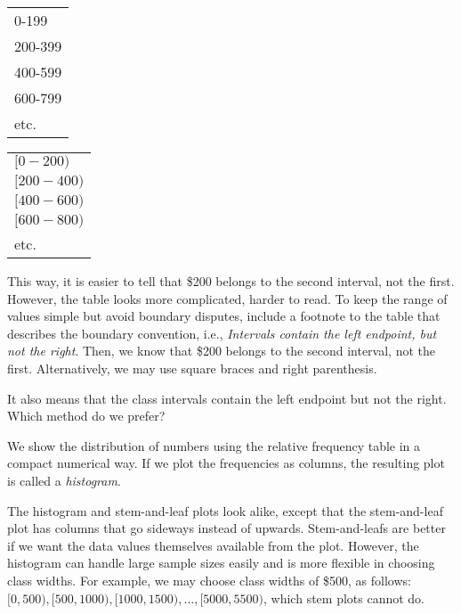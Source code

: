 \documentclass[11pt]{book}\usepackage[]{graphicx}\usepackage[]{color}
\begin{document}
\begin{minipage}[ht]{6cm}

\begin{tabular}{@{} l @{}} \hline
0-199 \\
200-399 \\
400-599 \\
600-799 \\
etc. \\ \hline
\end{tabular}

\end{minipage}
\begin{minipage}[ht]{6cm}

\begin{tabular}{@{} l @{}} \hline
$ [0-200)$ \\
$ [200-400)$ \\
$ [400-600)$ \\
$ [600-800)$ \\
 etc. \\ \hline
\end{tabular}
\end{minipage}

\vspace{3mm}

This way, it is easier to tell that \$200 belongs to the second interval, not the first.  However, the table looks more complicated, harder to read.  To keep the range of values simple but avoid boundary disputes, include a footnote to the table that describes the boundary convention, i.e., \textit{Intervals contain the left endpoint, but not the right}.  Then, we know that \$200 belongs to the second interval, not the first.  Alternatively, we may use square braces and right parenthesis.

It also means that the class intervals contain the left endpoint but not the right.  Which method do we prefer?

We show the distribution of numbers using the relative frequency table in a compact numerical way.  If we plot the frequencies as columns, the resulting plot is called a \textit{histogram}.

The histogram and stem-and-leaf plots look alike, except that the stem-and-leaf plot has columns that go sideways instead of upwards.  Stem-and-leafs are better if we want the data values themselves available from the plot.  However, the histogram can handle large sample sizes easily and is more flexible in choosing class widths.  For example, we may choose class widths of \$500, as follows: $[0,500), [500,1000), [1000,1500), \dots, [5000,5500)$, which stem plots cannot do.   
\end{document}

